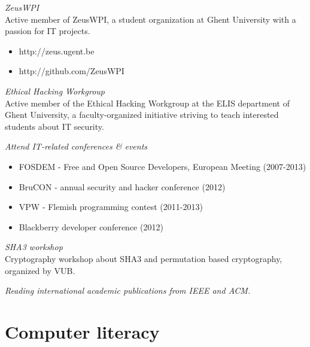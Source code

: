\documentclass[margin, 10pt]{res} %
\begin{document}
\begin{resume}
{\sl ZeusWPI} \\
Active member of ZeusWPI, a student organization at Ghent University with a passion for IT projects.
\begin{itemize} \itemsep -2pt
\item{http://zeus.ugent.be}
\item{http://github.com/ZeusWPI}
\end{itemize}

{\sl Ethical Hacking Workgroup} \\
Active member of the Ethical Hacking Workgroup at the ELIS department of Ghent University, a faculty-organized initiative striving to teach interested students about IT security.

{\sl Attend IT-related conferences \& events}
\begin{itemize} \itemsep -2pt
\item FOSDEM - Free and Open Source Developers, European Meeting (2007-2013)
\item BruCON - annual security and hacker conference (2012)
\item VPW - Flemish programming contest (2011-2013)
\item Blackberry developer conference (2012)
\end{itemize}

{\sl SHA3 workshop} \\
Cryptography workshop about SHA3 and permutation based cryptography, organized by VUB. 


{\sl Reading international academic publications from IEEE and ACM.}

\end{resume}
\newpage
\section{Computer literacy}
\end{document}
